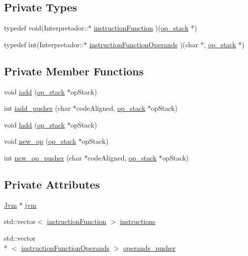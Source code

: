 \subsection*{Private Types}
\begin{DoxyCompactItemize}
\item 
typedef void(Interpretador\+::$\ast$ \hyperlink{classInterpretador_aaf603472f241d9de30ebf482cabb1ffc}{instruction\+Function} )(\hyperlink{frame_8hpp_a27f9a444058fa5dfb484ef1347edd937}{op\+\_\+stack} $\ast$)
\item 
typedef int(Interpretador\+::$\ast$ \hyperlink{classInterpretador_a6202f301ed122ef7572356e51333a18c}{instruction\+Function\+Operands} )(char $\ast$, \hyperlink{frame_8hpp_a27f9a444058fa5dfb484ef1347edd937}{op\+\_\+stack} $\ast$)
\end{DoxyCompactItemize}
\subsection*{Private Member Functions}
\begin{DoxyCompactItemize}
\item 
void \hyperlink{classInterpretador_a165915133c412ded3f754ec43121a23b}{iadd} (\hyperlink{frame_8hpp_a27f9a444058fa5dfb484ef1347edd937}{op\+\_\+stack} $\ast$op\+Stack)
\item 
int \hyperlink{classInterpretador_aa5b5ae5978b9f45f629807fa3e10c496}{iadd\+\_\+pusher} (char $\ast$code\+Aligned, \hyperlink{frame_8hpp_a27f9a444058fa5dfb484ef1347edd937}{op\+\_\+stack} $\ast$op\+Stack)
\item 
void \hyperlink{classInterpretador_a448412cfc43f6b5501a0e9a61f9a4e12}{ladd} (\hyperlink{frame_8hpp_a27f9a444058fa5dfb484ef1347edd937}{op\+\_\+stack} $\ast$op\+Stack)
\item 
void \hyperlink{classInterpretador_a5b8ee7fdcf502ad96762f874903b3e05}{new\+\_\+op} (\hyperlink{frame_8hpp_a27f9a444058fa5dfb484ef1347edd937}{op\+\_\+stack} $\ast$op\+Stack)
\item 
int \hyperlink{classInterpretador_a10103aeb6ee4fd69ebf1307043bb6036}{new\+\_\+op\+\_\+pusher} (char $\ast$code\+Aligned, \hyperlink{frame_8hpp_a27f9a444058fa5dfb484ef1347edd937}{op\+\_\+stack} $\ast$op\+Stack)
\end{DoxyCompactItemize}
\subsection*{Private Attributes}
\begin{DoxyCompactItemize}
\item 
\hyperlink{classJvm}{Jvm} $\ast$ \hyperlink{classInterpretador_aed3bd481ff345333414aa70360a94b7c}{jvm}
\item 
std\+::vector$<$ \hyperlink{classInterpretador_aaf603472f241d9de30ebf482cabb1ffc}{instruction\+Function} $>$ \hyperlink{classInterpretador_ad31e757e96232fbfc88637b26263055f}{instructions}
\item 
std\+::vector\\*
$<$ \hyperlink{classInterpretador_a6202f301ed122ef7572356e51333a18c}{instruction\+Function\+Operands} $>$ \hyperlink{classInterpretador_a25ace76ac4d752a224422fadfb550ebf}{operands\+\_\+pusher}
\end{DoxyCompactItemize}


